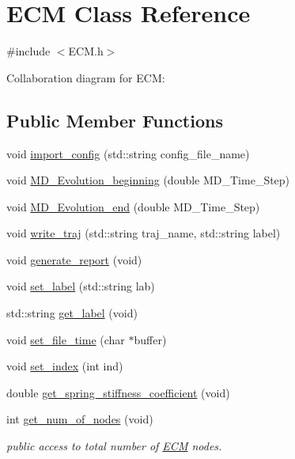 \hypertarget{classECM}{}\section{E\+CM Class Reference}
\label{classECM}


{\ttfamily \#include $<$E\+C\+M.\+h$>$}



Collaboration diagram for E\+CM\+:
\subsection*{Public Member Functions}
\begin{DoxyCompactItemize}
\item 
void \mbox{\hyperlink{classECM_ad0f4b70c1e02703565ae0fc6428eaf22}{import\+\_\+config}} (std\+::string config\+\_\+file\+\_\+name)
\item 
void \mbox{\hyperlink{classECM_ace592138fc9af4c5c4717c682924fdbe}{M\+D\+\_\+\+Evolution\+\_\+beginning}} (double M\+D\+\_\+\+Time\+\_\+\+Step)
\item 
void \mbox{\hyperlink{classECM_a797a29a087e5aefdb2f14352259df371}{M\+D\+\_\+\+Evolution\+\_\+end}} (double M\+D\+\_\+\+Time\+\_\+\+Step)
\item 
void \mbox{\hyperlink{classECM_acf7ff0e1b7a7631eff70c8584d01c050}{write\+\_\+traj}} (std\+::string traj\+\_\+name, std\+::string label)
\item 
void \mbox{\hyperlink{classECM_ab6d157d62196d68af2437ffb3edc19fe}{generate\+\_\+report}} (void)
\item 
void \mbox{\hyperlink{classECM_aa2f9122b1b849ab31856464889d328f4}{set\+\_\+label}} (std\+::string lab)
\item 
std\+::string \mbox{\hyperlink{classECM_a2979fbe785c15c43932ba9f6590fd4ef}{get\+\_\+label}} (void)
\item 
void \mbox{\hyperlink{classECM_ae637a880979bf8ea181b09b41a575fd1}{set\+\_\+file\+\_\+time}} (char $\ast$buffer)
\item 
void \mbox{\hyperlink{classECM_a78e54e27714f2ed310b75296eaba5495}{set\+\_\+index}} (int ind)
\item 
double \mbox{\hyperlink{classECM_ad3602738d7ce353dea8dc7c957080815}{get\+\_\+spring\+\_\+stiffness\+\_\+coefficient}} (void)
\item 
int \mbox{\hyperlink{classECM_a6890f319e54f20f6090dff58b95f4459}{get\+\_\+num\+\_\+of\+\_\+nodes}} (void)
\begin{DoxyCompactList}\small\item\em public access to total number of \mbox{\hyperlink{classECM}{E\+CM}} nodes. \end{DoxyCompactList}\item 

\end{DoxyCompactItemize}
